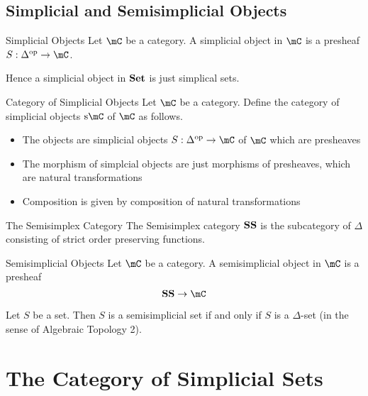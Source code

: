 \documentclass[a4paper]{article}
\begin{document}
\subsection{Simplicial and Semisimplicial Objects}
\begin{defn}{Simplicial Objects}{} Let $\mC$ be a category. A simplicial object in $\mC$ is a presheaf $S:\Delta^\text{op}\to\mC$. 
\end{defn}

Hence a simplicial object in $\bold{Set}$ is just simplical sets. 

\begin{defn}{Category of Simplicial Objects}{} Let $\mC$ be a category. Define the category of simplicial objects $\text{s}\mC$ of $\mC$ as follows. 
\begin{itemize}
\item The objects are simplicial objects $S:\Delta^\text{op}\to\mC$ of $\mC$ which are presheaves
\item The morphism of simplcial objects are just morphisms of presheaves, which are natural transformations
\item Composition is given by composition of natural transformations
\end{itemize}
\end{defn}

\begin{defn}{The Semisimplex Category}{} The Semisimplex category $\bold{SS}$ is the subcategory of $\Delta$ consisting of strict order preserving functions. 
\end{defn}

\begin{defn}{Semisimplicial Objects}{} Let $\mC$ be a category. A semisimplicial object in $\mC$ is a presheaf $$\bold{SS}\to\mC$$
\end{defn}

\begin{lmm}{}{} Let $S$ be a set. Then $S$ is a semisimplicial set if and only if $S$ is a $\Delta$-set (in the sense of Algebraic Topology 2). 
\end{lmm}

\pagebreak
\section{The Category of Simplicial Sets}
\end{document}
